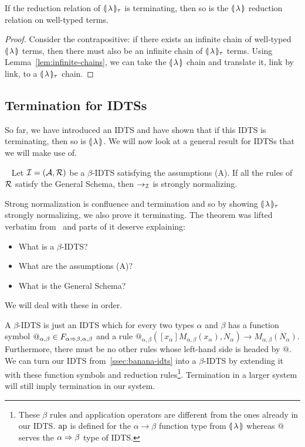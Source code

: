 \begin{corollary}
  If the reduction relation of $\llparenthesis \, \lambda \, \rrparenthesis_\tau$ is terminating, then
  so is the $\llparenthesis \, \lambda \, \rrparenthesis$ reduction relation on well-typed terms.
\end{corollary}

\begin{proof}
  Consider the contrapositive: if there exists an infinite chain of
  well-typed $\llparenthesis \, \lambda \, \rrparenthesis$ terms, then there must also be an infinite
  chain of $\llparenthesis \, \lambda \, \rrparenthesis_\tau$ terms. Using
  Lemma~\ref{lem:infinite-chains}, we can take the $\llparenthesis \, \lambda \, \rrparenthesis$ chain
  and translate it, link by link, to a $\llparenthesis \, \lambda \, \rrparenthesis_\tau$ chain.
\end{proof}


\subsection{Termination for IDTSs}

So far, we have introduced an IDTS and have shown that if this IDTS is
terminating, then so is $\llparenthesis \, \lambda \, \rrparenthesis$. We will now look at a general result
for IDTSs that we will make use of.

\begin{theorem}
  \label{thm:idts-normalization}
  ~\cite{blanqui2000termination} Let
  $\mathcal{I} = (\mathcal{A}, \mathcal{R})$ be a $\beta$-IDTS satisfying the assumptions (A). If
  all the rules of $\mathcal{R}$ satisfy the General Schema, then $\to_{\mathcal{I}}$ is
  strongly normalizing.
\end{theorem}

Strong normalization is confluence and termination and so by showing
$\llparenthesis \, \lambda \, \rrparenthesis_\tau$ strongly normalizing, we also prove it
terminating. The theorem was lifted verbatim
from~\cite{blanqui2000termination} and parts of it deserve explaining:

\begin{itemize}
\item What is a $\beta$-IDTS?
\item What are the assumptions (A)?
\item What is the General Schema?
\end{itemize}

We will deal with these in order.

A $\beta$-IDTS is just an IDTS which for every two types $\alpha$ and
$\beta$ has a function symbol
$@_{\alpha,\beta} \in F_{\alpha \Rightarrow \beta,\alpha,\beta}$ and a rule
$@_{\alpha,\beta}([x_\alpha] M_{\alpha, \beta}(x_\alpha), N_\alpha) \to
M_{\alpha,\beta}(N_\alpha)$. Furthermore, there must be no other rules
whose left-hand side is headed by $@$. We can turn our IDTS
from~\ref{ssec:banana-idts} into a $\beta$-IDTS by extending it with these
function symbols and reduction rules\footnote{These $\beta$ rules and
  application operators are different from the ones already in our
  IDTS. $\operatorname{ap}$ is defined for the $\alpha \to \beta$ function type from
  $\llparenthesis \, \lambda \, \rrparenthesis$ whereas $@$ serves the $\alpha \Rightarrow \beta$ type of
  IDTS.}. Termination in a larger system will still imply termination in
our system.

